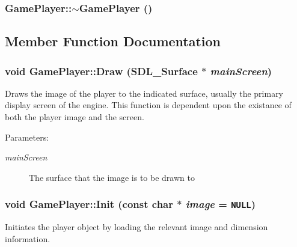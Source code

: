 \hypertarget{class_game_player_ad6c1016873c9e4750ce370552541745}{
\subsubsection[{$\sim$GamePlayer}]{\setlength{\rightskip}{0pt plus 5cm}GamePlayer::$\sim$GamePlayer ()}}
\label{d7/df6/class_game_player_ad6c1016873c9e4750ce370552541745}




\subsection{Member Function Documentation}
\hypertarget{class_game_player_3e5c897e5120b5297e7226a4cb143742}{
\subsubsection[{Draw}]{\setlength{\rightskip}{0pt plus 5cm}void GamePlayer::Draw (SDL\_\-Surface $\ast$ {\em mainScreen})}}
\label{d7/df6/class_game_player_3e5c897e5120b5297e7226a4cb143742}


Draws the image of the player to the indicated surface, usually the primary display screen of the engine. This function is dependent upon the existance of both the player image and the screen.

\begin{Desc}
\item[Parameters:]
\begin{description}
\item[{\em mainScreen}]The surface that the image is to be drawn to \end{description}
\end{Desc}
\hypertarget{class_game_player_937dcf8e5b90200f5ae0a3418adf7271}{
\subsubsection[{Init}]{\setlength{\rightskip}{0pt plus 5cm}void GamePlayer::Init (const char $\ast$ {\em image} = {\tt NULL})}}
\label{d7/df6/class_game_player_937dcf8e5b90200f5ae0a3418adf7271}


Initiates the player object by loading the relevant image and dimension information.

